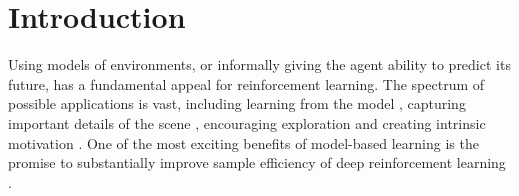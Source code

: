 

\section{Introduction}


Using models of environments, or informally giving the agent ability to predict its future, has a fundamental appeal for reinforcement learning. The spectrum of possible applications is vast, including learning
from the model \cite[Chapter 8]{sutton_barto_2017, pixel1, pixel2, pixel3, raw_visual}, capturing important details of the scene \cite{world_models}, encouraging exploration \cite{video_prediction} and creating intrinsic motivation \cite{pathak}. %
One of the most exciting benefits of model-based learning is the promise to substantially improve sample efficiency of deep reinforcement learning %
\cite[Chapter 8]{sutton_barto_2017}.


